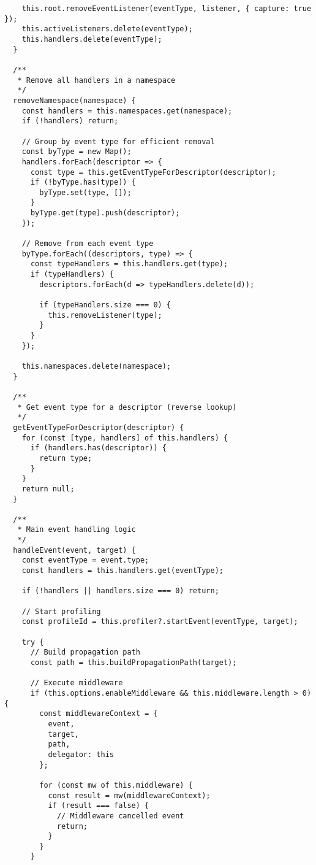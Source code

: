 \documentclass[11pt]{article}
\begin{document}
\begin{verbatim}
    this.root.removeEventListener(eventType, listener, { capture: true });
    this.activeListeners.delete(eventType);
    this.handlers.delete(eventType);
  }
  
  /**
   * Remove all handlers in a namespace
   */
  removeNamespace(namespace) {
    const handlers = this.namespaces.get(namespace);
    if (!handlers) return;
    
    // Group by event type for efficient removal
    const byType = new Map();
    handlers.forEach(descriptor => {
      const type = this.getEventTypeForDescriptor(descriptor);
      if (!byType.has(type)) {
        byType.set(type, []);
      }
      byType.get(type).push(descriptor);
    });
    
    // Remove from each event type
    byType.forEach((descriptors, type) => {
      const typeHandlers = this.handlers.get(type);
      if (typeHandlers) {
        descriptors.forEach(d => typeHandlers.delete(d));
        
        if (typeHandlers.size === 0) {
          this.removeListener(type);
        }
      }
    });
    
    this.namespaces.delete(namespace);
  }
  
  /**
   * Get event type for a descriptor (reverse lookup)
   */
  getEventTypeForDescriptor(descriptor) {
    for (const [type, handlers] of this.handlers) {
      if (handlers.has(descriptor)) {
        return type;
      }
    }
    return null;
  }
  
  /**
   * Main event handling logic
   */
  handleEvent(event, target) {
    const eventType = event.type;
    const handlers = this.handlers.get(eventType);
    
    if (!handlers || handlers.size === 0) return;
    
    // Start profiling
    const profileId = this.profiler?.startEvent(eventType, target);
    
    try {
      // Build propagation path
      const path = this.buildPropagationPath(target);
      
      // Execute middleware
      if (this.options.enableMiddleware && this.middleware.length > 0) {
        const middlewareContext = {
          event,
          target,
          path,
          delegator: this
        };
        
        for (const mw of this.middleware) {
          const result = mw(middlewareContext);
          if (result === false) {
            // Middleware cancelled event
            return;
          }
        }
      }
      

\end{verbatim}
\end{document}
